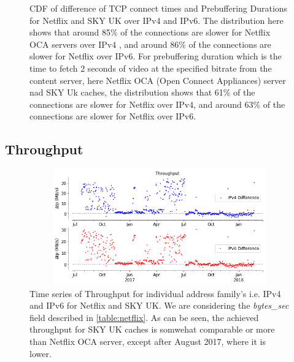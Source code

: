 \begin{figure}
\begin{minipage}{0.5\textwidth}
	\end{minipage}
	\caption[SKY UK Connect Time and Prebuffering Duration CDF Deltas]{CDF of difference of TCP connect times and Prebuffering Durations for Netflix and SKY UK over IPv4 and IPv6. The distribution here shows that around 85\% of the connections are slower for Netflix OCA servers over IPv4 , and around 86\% of the connections are slower for Netflix over IPv6. 
For prebuffering duration which is the time to fetch 2 seconds of video at the specified bitrate from the content server, here Netflix OCA (Open Connect Appliances) server nad SKY Uk caches,
the distribution shows that 61\% of the connections are slower for Netflix over IPv4, and around 63\% of the connections are slower for Netflix over IPv6.}
	\label{fig:SKY UK Connect Time and Prebuffering Duration CDF Deltas}
\end{figure}

\FloatBarrier

\subsection*{Throughput}

\begin{figure}[!ht]
	\centering
	\includegraphics[keepaspectratio, height=5cm, width=15cm]{figures/cache/bskyb/netflix-throughput-timeseries-asn-5607.png}
	\caption[SKY UK Throughput Timeseries Absolute]{Time series of Throughput for individual address family's i.e. IPv4 and IPv6 for Netflix and SKY UK. We are considering 
	the \textit{bytes\_sec} field described in \cref{table:netflix}. As can be seen, the achieved throughput for SKY UK caches is somwehat comparable or more than Netflix OCA server, except after August 2017, where it is lower.}
	\label{fig:SKY UK Throughput Timeseries Absolute}
\end{figure}

